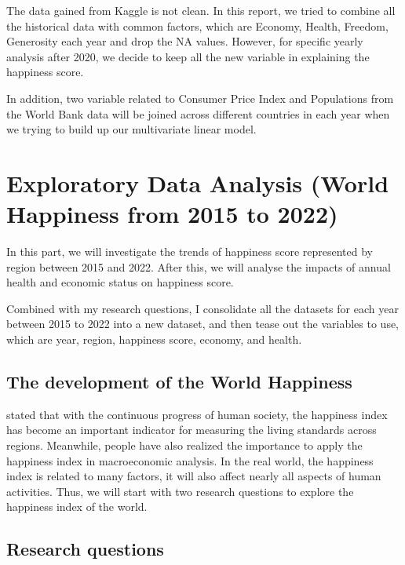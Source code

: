 \documentclass[11pt,a4paper,]{article}
\begin{document}
The data gained from Kaggle is not clean. In this report, we tried to combine all the historical data with common factors, which are Economy, Health, Freedom, Generosity each year and drop the NA values. However, for specific yearly analysis after 2020, we decide to keep all the new variable in explaining the happiness score.

In addition, two variable related to Consumer Price Index and Populations from the World Bank data will be joined across different countries in each year when we trying to build up our multivariate linear model.

\hypertarget{exploratory-data-analysis-world-happiness-from-2015-to-2022}{%
\section{Exploratory Data Analysis (World Happiness from 2015 to 2022)}\label{exploratory-data-analysis-world-happiness-from-2015-to-2022}}

In this part, we will investigate the trends of happiness score represented by region between 2015 and 2022. After this, we will analyse the impacts of annual health and economic status on happiness score.

Combined with my research questions, I consolidate all the datasets for each year between 2015 to 2022 into a new dataset, and then tease out the variables to use, which are year, region, happiness score, economy, and health.

\hypertarget{the-development-of-the-world-happiness}{%
\subsection{The development of the World Happiness}\label{the-development-of-the-world-happiness}}

\textcite{helliwell2012state} stated that with the continuous progress of human society, the happiness index has become an important indicator for measuring the living standards across regions. Meanwhile, people have also realized the importance to apply the happiness index in macroeconomic analysis. In the real world, the happiness index is related to many factors, it will also affect nearly all aspects of human activities. Thus, we will start with two research questions to explore the happiness index of the world.

\hypertarget{research-questions-1}{%
\subsection{Research questions}\label{research-questions-1}}
\end{document}
